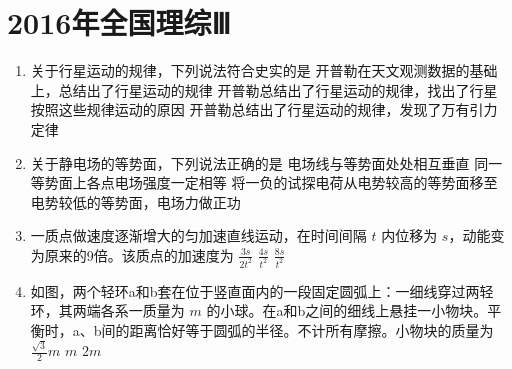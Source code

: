 \documentclass[\gkver]{gaokaozhenti}
\begin{document}
\chapter{2016年全国理综Ⅲ}

\begin{enumerate}
\item
关于行星运动的规律，下列说法符合史实的是
{开普勒在天文观测数据的基础上，总结出了行星运动的规律}
{开普勒总结出了行星运动的规律，找出了行星按照这些规律运动的原因}
{开普勒总结出了行星运动的规律，发现了万有引力定律}


\item
关于静电场的等势面，下列说法正确的是
{电场线与等势面处处相互垂直}
{同一等势面上各点电场强度一定相等}
{将一负的试探电荷从电势较高的等势面移至电势较低的等势面，电场力做正功}


\item
一质点做速度逐渐增大的匀加速直线运动，在时间间隔 $t$ 内位移为 $s$，动能变为原来的9倍。该质点的加速度为
{$\frac{3s}{2t^{2}}$}
{$\frac{4s}{t^{2}}$}
{$\frac{8s}{t^{2}}$}


\item
如图，两个轻环a和b套在位于竖直面内的一段固定圆弧上：一细线穿过两轻环，其两端各系一质量为 $m$ 的小球。在a和b之间的细线上悬挂一小物块。平衡时，a、b间的距离恰好等于圆弧的半径。不计所有摩擦。小物块的质量为
{$\frac{\sqrt{3}}{2}m$}
{$m$}
{$2m$}


\end{enumerate}
\end{document}
